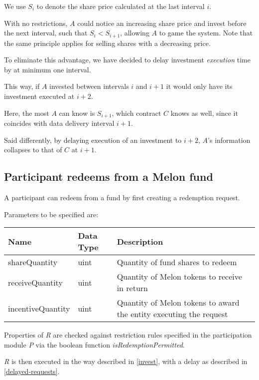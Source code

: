 \documentclass[conference]{IEEEtran}
\begin{document}
We use $S_i$ to denote the share price calculated at the last interval $i$.

With no restrictions, $A$ could notice an increasing share price and invest before the next interval, such that $S_i < S_{i+1}$, allowing $A$ to game the system.
Note that the same principle applies for selling shares with a decreasing price.

To eliminate this advantage, we have decided to delay investment \textit{execution} time by at minimum one interval.

This way, if $A$ invested between intervals $i$ and $i+1$ it would only have its investment executed at $i+2$.

Here, the most $A$ can know is $S_{i+1}$, which contract $C$ knows as well, since it coincides with data delivery interval $i+1$.

Said differently, by delaying execution of an investment to $i+2$, $A$'s information collapses to that of $C$ at $i+1$.

\subsection{Participant redeems from a Melon fund} \label{redeem}

A participant can redeem from a fund by first creating a redemption request.

Parameters to be specified are:

\begin{center}
		\footnotesize
		\begin{tabular}{ | p{2cm} | p{1.2cm} | p{4cm} | }
		\hline
		Name & Data Type & Description \\ \hline
		shareQuantity & uint & Quantity of fund shares to redeem \\ \hline
		receiveQuantity & uint & Quantity of Melon tokens to receive in return \\ \hline
		incentiveQuantity & uint & Quantity of Melon tokens to award the entity executing the request \\ \hline
	\end{tabular}
\end{center}

Properties of \textit{R} are checked against restriction rules specified in the participation module \textit{P} via the boolean function \textit{isRedemptionPermitted}.

\textit{R} is then executed in the way described in \ref{invest}, with a delay as described in \ref{delayed-requests}.
\end{document}
